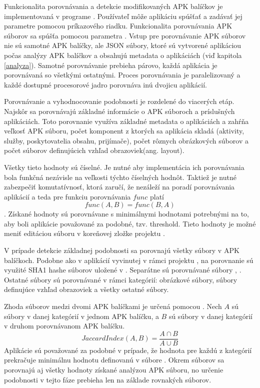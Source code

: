 Funkcionalita porovnávania a detekcie modifikovaných APK balíčkov je implementovaná v programe . Používateľ môže aplikáciu spúšťať a zadávať jej parametre pomocou príkazového riadku. Funkcionalita porovnávania APK súborov sa spúšťa pomocou parametra . Vstup pre porovnávanie APK súborov nie sú samotné APK balíčky, ale JSON súbory, ktoré sú vytvorené aplikáciou  počas analýzy APK balíčkov a obsahujú metadata o aplikáciách (viď kapitola \ref{analyza}). Samotné porovnávanie prebieha párovo, každá aplikácia je porovnávaná so všetkými ostatnými. Proces porovnávania je paralelizovaný a každé dostupné procesorové jadro porovnáva inú dvojicu aplikácií. 

Porovnávanie a vyhodnocovanie podobnosti je rozdelené do viacerých etáp. Najskôr sa porovnávajú základné informácie o APK súboroch a príslušných aplikáciách. Toto porovnanie využíva základné metadata o aplikáciách a zahŕňa veľkosť APK súboru, počet komponent z ktorých sa aplikácia skladá (aktivity, služby, poskytovatelia obsahu, prijímače), počet rôznych obrázkových súborov a počet súborov definujúcich vzhľad obrazoviek(ang. layout).

Všetky tieto hodnoty sú číselné. Je nutné aby implementácia ich porovnávania bola funkčná nezávisle na veľkosti týchto číselných hodnôt. Taktiež je nutné zabezpečiť komutatívnosť, ktorá zaručí, že nezáleží na poradí porovnávania aplikácií a teda pre funkciu porovnávania $func$ platí \[func(A,B) = func(B,A)\]. Získané hodnoty sú porovnávane s minimálnymi hodnotami potrebnými na to, aby boli aplikácie považované za podobné, tzv. threshold. Tieto hodnoty je možné meniť editáciou súboru  v koreňovej zložke projektu .

V prípade detekcie základnej podobnosti sa porovnajú všetky súbory v APK balíčkoch. Podobne ako v aplikácií vyvinutej v rámci projektu , na porovnanie sú využité SHA1 hashe súborov uložené v . Separátne sú porovnávané súbory , . Ostatné súbory sú porovnávané v rámci kategórií: obrázkové súbory, súbory definujúce vzhľad obrazoviek a všetky ostatné súbory. 

Zhoda súborov medzi dvomi APK balíčkami je určená pomocou . Nech $A$ sú súbory v danej kategórií v jednom APK balíčku, a $B$ sú súbory v danej kategórií v druhom porovnávanom APK balíčku. \[Jaccard Index(A,B) = \frac{A \cap B}{ A \cup B}\] Aplikácie sú považované za podobné v prípade, že hodnota  pre každú z kategórií prekračuje minimálnu hodnotu definovanú v súbore . Okrem súborov sa porovnajú aj všetky hodnoty získané analýzou APK súboru, no určenie podobnosti v tejto fáze prebieha len na základe rovnakých súborov. 

